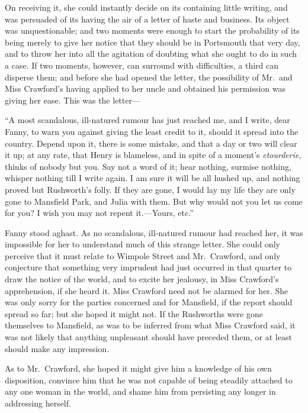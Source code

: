 On receiving it, she could instantly decide on its
containing little writing, and was persuaded of its
having the air of a letter of haste and business.
Its object was unquestionable; and two moments were
enough to start the probability of its being merely
to give her notice that they should be in Portsmouth
that very day, and to throw her into all the agitation
of doubting what she ought to do in such a case.
If two moments, however, can surround with difficulties,
a third can disperse them; and before she had opened
the letter, the possibility of Mr.\ and Miss Crawford's
having applied to her uncle and obtained his permission
was giving her ease.  This was the letter---%

``A most scandalous, ill-natured rumour has just reached me,
and I write, dear Fanny, to warn you against giving the
least credit to it, should it spread into the country.
Depend upon it, there is some mistake, and that a day or two
will clear it up; at any rate, that Henry is blameless,
and in spite of a moment's \emph{etourderie}, thinks of
nobody but you.  Say not a word of it; hear nothing,
surmise nothing, whisper nothing till I write again.
I am sure it will be all hushed up, and nothing proved
but Rushworth's folly.  If they are gone, I would lay
my life they are only gone to Mansfield Park, and Julia
with them.  But why would not you let us come for you?
I wish you may not repent it.---Yours, etc.''

Fanny stood aghast.  As no scandalous, ill-natured rumour
had reached her, it was impossible for her to understand
much of this strange letter.  She could only perceive
that it must relate to Wimpole Street and Mr.\ Crawford,
and only conjecture that something very imprudent had just
occurred in that quarter to draw the notice of the world,
and to excite her jealousy, in Miss Crawford's apprehension,
if she heard it.  Miss Crawford need not be alarmed
for her.  She was only sorry for the parties concerned
and for Mansfield, if the report should spread so far;
but she hoped it might not.  If the Rushworths were gone
themselves to Mansfield, as was to be inferred from
what Miss Crawford said, it was not likely that anything
unpleasant should have preceded them, or at least should
make any impression.

As to Mr.\ Crawford, she hoped it might give him a knowledge
of his own disposition, convince him that he was not capable
of being steadily attached to any one woman in the world,
and shame him from persisting any longer in addressing herself.


